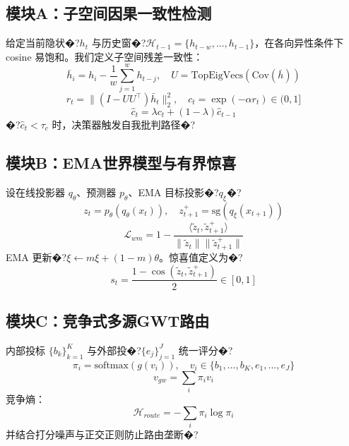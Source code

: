 \documentclass[10pt,twocolumn]{ctexart}
\begin{document}
\subsection{模块A：子空间因果一致性检测}
给定当前隐状�?$h_t$ 与历史窗�?$\mathcal{H}_{t-1}=\{h_{t-w},...,h_{t-1}\}$，在各向异性条件下 cosine 易饱和。我们定义子空间残差一致性：
\begin{equation}
\bar{h}_i=h_i-\frac{1}{w}\sum_{j=1}^{w}h_{t-j},\quad U=\text{TopEigVecs}(\text{Cov}(\bar{h}))
\end{equation}
\begin{equation}
r_t = \lVert (I-UU^\top)\bar{h}_t \rVert_2^2,\quad c_t = \exp(-\alpha r_t)\in(0,1]
\end{equation}
\begin{equation}
\hat{c}_t = \lambda c_t + (1-\lambda)\hat{c}_{t-1}
\end{equation}
�?$\hat{c}_t<\tau_c$ 时，决策器触发自我批判路径�?

\subsection{模块B：EMA世界模型与有界惊喜}
设在线投影器 $q_\theta$、预测器 $p_\theta$、EMA 目标投影�?$q_{\xi}$�?
\begin{equation}
z_t = p_\theta(q_\theta(x_t)),\quad z^+_{t+1}=\text{sg}(q_{\xi}(x_{t+1}))
\end{equation}
\begin{equation}
\mathcal{L}_{wm} = 1 - \frac{\langle \tilde{z}_t,\tilde{z}^+_{t+1}\rangle}{\lVert \tilde{z}_t\rVert\lVert \tilde{z}^+_{t+1}\rVert}
\end{equation}
EMA 更新�?$\xi\leftarrow m\xi + (1-m)\theta$。惊喜值定义为�?
\begin{equation}
s_t=\frac{1-\cos(\tilde{z}_t,\tilde{z}^+_{t+1})}{2}\in[0,1]
\end{equation}

\subsection{模块C：竞争式多源GWT路由}
内部投标 $\{b_k\}_{k=1}^{K}$ 与外部投�?$\{e_j\}_{j=1}^{J}$ 统一评分�?
\begin{equation}
\pi_i = \text{softmax}(g(v_i)),\quad v_i\in\{b_1,...,b_K,e_1,...,e_J\}
\end{equation}
\begin{equation}
v_{gw} = \sum_i \pi_i v_i
\end{equation}
竞争熵：
\begin{equation}
\mathcal{H}_{route} = -\sum_i \pi_i\log\pi_i
\end{equation}
并结合打分噪声与正交正则防止路由垄断�?
\end{document}
